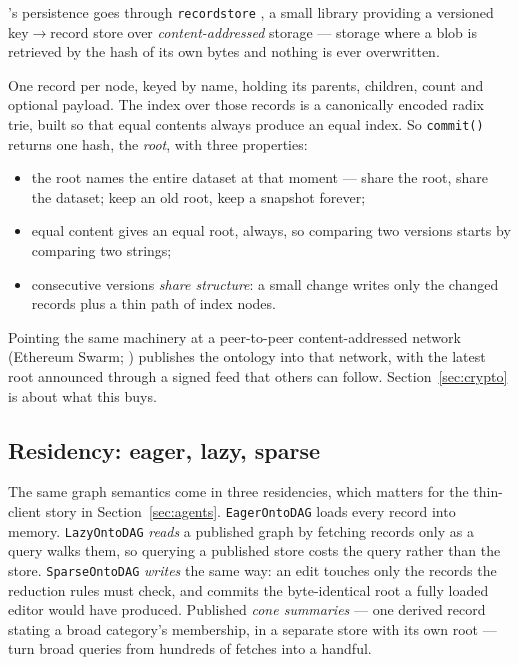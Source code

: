 \odag{}'s persistence goes through \texttt{recordstore} \citep{recordstore}, a
small library providing a versioned key$\to$record store over
\emph{content-addressed} storage --- storage where a blob is retrieved by the
hash of its own bytes and nothing is ever overwritten.

One record per node, keyed by name, holding its parents, children, count and
optional payload. The index over those records is a canonically encoded
radix trie, built so that equal contents always produce an equal index. So
\verb|commit()| returns one hash, the \emph{root}, with three properties:

\begin{itemize}[leftmargin=1.4em]
\item the root names the entire dataset at that moment --- share the root,
  share the dataset; keep an old root, keep a snapshot forever;
\item equal content gives an equal root, always, so comparing two versions
  starts by comparing two strings;
\item consecutive versions \emph{share structure}: a small change writes only
  the changed records plus a thin path of index nodes.
\end{itemize}

Pointing the same machinery at a peer-to-peer content-addressed network
(Ethereum Swarm; \citealp{tron2020}) publishes the ontology into that network,
with the latest root announced through a signed feed that others can follow.
Section~\ref{sec:crypto} is about what this buys.

\subsection{Residency: eager, lazy, sparse}

The same graph semantics come in three residencies, which matters for the
thin-client story in Section~\ref{sec:agents}. \texttt{EagerOntoDAG} loads
every record into memory. \texttt{LazyOntoDAG} \emph{reads} a published graph
by fetching records only as a query walks them, so querying a published store
costs the query rather than the store. \texttt{SparseOntoDAG} \emph{writes}
the same way: an edit touches only the records the reduction rules must
check, and commits the byte-identical root a fully loaded editor would have
produced. Published \emph{cone summaries} --- one derived record stating a
broad category's membership, in a separate store with its own root --- turn
broad queries from hundreds of fetches into a handful.


